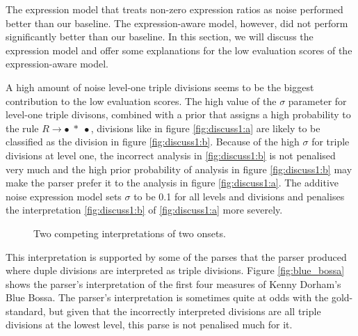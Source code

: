 The expression model that treats non-zero expression ratios as noise performed better than our baseline. The expression-aware model, however, did not perform significantly better than our baseline. In this section, we will discuss the expression model and offer some explanations for the low evaluation scores of the expression-aware model.


A high amount of noise level-one triple divisions seems to be the biggest contribution to the low evaluation scores. The high value of the $\sigma$ parameter for level-one triple divisons, combined with a prior that assigns a high probability to the rule $R \rightarrow \bullet\; *\; \bullet$, divisions like in figure \ref{fig:discuss1:a} are likely to be classified as the division in figure \ref{fig:discuss1:b}. Because of the high $\sigma$ for triple divisions at level one, the incorrect analysis in \ref{fig:discuss1:b} is not penalised very much and the high prior probability of analysis in figure \ref{fig:discuss1:b} may make the parser prefer it to the analysis in figure \ref{fig:discuss1:a}. The additive noise expression model sets $\sigma$ to be 0.1 for all levels and divisions and penalises the interpretation \ref{fig:discuss1:b} of \ref{fig:discuss1:a} more severely.

\begin{figure}
\centering
{}
\caption{Two competing interpretations of two onsets.}
\label{fig:discuss1}
\end{figure}

This interpretation is supported by some of the parses that the parser produced where duple divisions are interpreted as triple divisions. Figure \ref{fig:blue_bossa} shows the parser's interpretation of the first four measures of Kenny Dorham's Blue Bossa. The parser's interpretation is sometimes quite at odds with the gold-standard, but given that the incorrectly interpreted divisions are all triple divisions at the lowest level, this parse is not penalised much for it.

